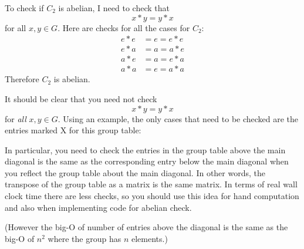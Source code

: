 To check if $C_2$ is abelian, I need to check that
\[
x * y = y * x
\]
for all $x, y \in G$.
Here are checks for all the cases for $C_2$:
\begin{align*}
e * e &= e = e * e \\
e * a &= a = a * e \\
a * e &= a = e * a \\
a * a &= e = a * a
\end{align*}
Therefore $C_2$ is abelian.

It should be clear that you need not check
\[
x * y = y * x
\]
for \textit{all} $x, y \in G$.
Using an example, the only cases that need to be checked are the
entries marked X for this group table:

In particular, you need to check the entries in the group
table above the main
diagonal is the same as the corresponding entry below the main
diagonal when you reflect the group table about the main diagonal.
In other words, the transpose of the group table as a matrix
is the same matrix.
In terms of real wall clock time there are less checks,
so you should use this idea for hand computation and
also when implementing code for abelian check.

(However the big-O of number of entries above the diagonal
is the same as the big-O of $n^2$ where the group has
$n$ elements.)

